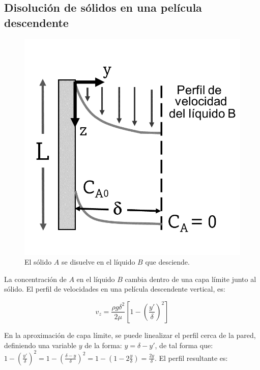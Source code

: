 \subsection{Disolución de sólidos en una película descendente}

\begin{figure}[H]
	\centering
	\includegraphics[scale=0.2]{./Capitulo2/Imagenes/fig-2-7.PNG}
	\caption{El sólido $A$ se disuelve en el líquido $B$ que desciende.}
\end{figure}

La concentración de $A$ en el líquido $B$ cambia dentro de una capa límite junto al sólido. El perfil de velocidades en una película descendente vertical, es:

\begin{equation}
	v_z = \frac{\rho g \delta^2}{2 \mu} \left[ 1 - \left( \frac{y'}{\delta} \right)^2 \right]
\end{equation}

En la aproximación de capa límite, se puede linealizar el perfil cerca de la pared, definiendo una variable $y$ de la forma: $y = \delta - y'$, de tal forma que: $1- \left( \frac{y'}{\delta} \right)^2 = 1 - \left( \frac{\delta - y}{\delta} \right)^2 = 1 - \left( 1- 2 \frac{y}{\delta} \right) =  \frac{2y}{\delta}$. 
\newline
El perfil resultante es:

